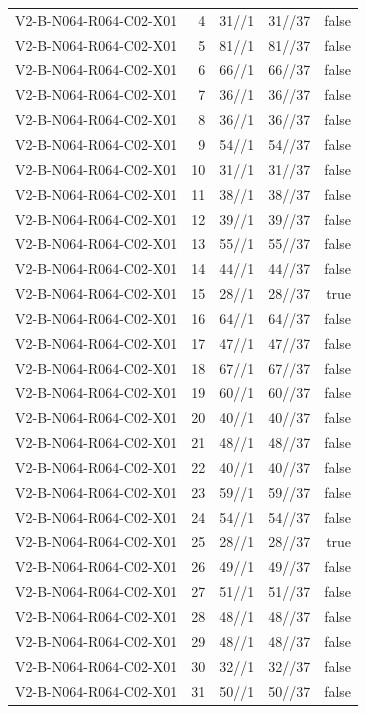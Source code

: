 {\begin{longtable}{lrrrr}
V2-B-N064-R064-C02-X01 & 4 & 31//1 & 31//37 & false \\
V2-B-N064-R064-C02-X01 & 5 & 81//1 & 81//37 & false \\
V2-B-N064-R064-C02-X01 & 6 & 66//1 & 66//37 & false \\
V2-B-N064-R064-C02-X01 & 7 & 36//1 & 36//37 & false \\
V2-B-N064-R064-C02-X01 & 8 & 36//1 & 36//37 & false \\
V2-B-N064-R064-C02-X01 & 9 & 54//1 & 54//37 & false \\
V2-B-N064-R064-C02-X01 & 10 & 31//1 & 31//37 & false \\
V2-B-N064-R064-C02-X01 & 11 & 38//1 & 38//37 & false \\
V2-B-N064-R064-C02-X01 & 12 & 39//1 & 39//37 & false \\
V2-B-N064-R064-C02-X01 & 13 & 55//1 & 55//37 & false \\
V2-B-N064-R064-C02-X01 & 14 & 44//1 & 44//37 & false \\
V2-B-N064-R064-C02-X01 & 15 & 28//1 & 28//37 & true \\
V2-B-N064-R064-C02-X01 & 16 & 64//1 & 64//37 & false \\
V2-B-N064-R064-C02-X01 & 17 & 47//1 & 47//37 & false \\
V2-B-N064-R064-C02-X01 & 18 & 67//1 & 67//37 & false \\
V2-B-N064-R064-C02-X01 & 19 & 60//1 & 60//37 & false \\
V2-B-N064-R064-C02-X01 & 20 & 40//1 & 40//37 & false \\
V2-B-N064-R064-C02-X01 & 21 & 48//1 & 48//37 & false \\
V2-B-N064-R064-C02-X01 & 22 & 40//1 & 40//37 & false \\
V2-B-N064-R064-C02-X01 & 23 & 59//1 & 59//37 & false \\
V2-B-N064-R064-C02-X01 & 24 & 54//1 & 54//37 & false \\
V2-B-N064-R064-C02-X01 & 25 & 28//1 & 28//37 & true \\
V2-B-N064-R064-C02-X01 & 26 & 49//1 & 49//37 & false \\
V2-B-N064-R064-C02-X01 & 27 & 51//1 & 51//37 & false \\
V2-B-N064-R064-C02-X01 & 28 & 48//1 & 48//37 & false \\
V2-B-N064-R064-C02-X01 & 29 & 48//1 & 48//37 & false \\
V2-B-N064-R064-C02-X01 & 30 & 32//1 & 32//37 & false \\
V2-B-N064-R064-C02-X01 & 31 & 50//1 & 50//37 & false \\

\end{longtable}}
